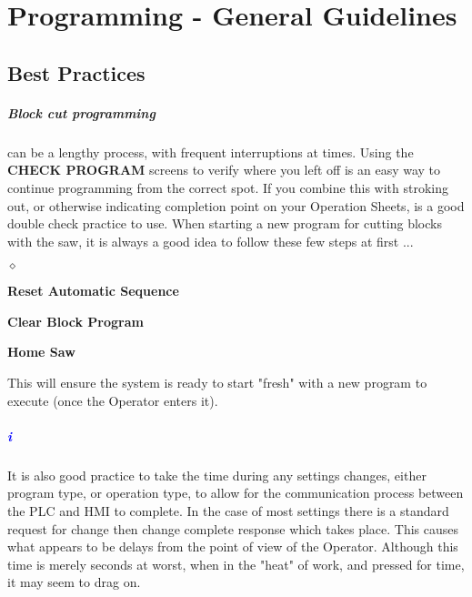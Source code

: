 \chapter{Programming - General Guidelines}
\section{Best Practices}\paragraph*{Block cut programming}can be a lengthy process, with frequent interruptions at times. Using the \textbf{CHECK PROGRAM} screens to verify where you left off is an easy way to continue programming from the correct spot. If you combine this with stroking out, or otherwise indicating completion point on your Operation Sheets, is a good double check practice to use. When starting a new program for cutting blocks with the saw, it is always a good idea to follow these few steps at first ...
\begin{list}{$\diamond$}{}
	\item \textbf{Reset Automatic Sequence}
	\item \textbf{Clear Block Program}
	\item \textbf{Home Saw}
\end{list}
This will ensure the system is ready to start "fresh" with a new program to execute (once the Operator enters it). 
\paragraph{\textbf{\LARGE \textcolor{blue}{i}}}It is also good practice to take the time during any settings changes, either program type, or operation type, to allow for the communication process between the PLC and HMI to complete. In the case of most settings there is a standard request for change then change complete response which takes place. This causes what appears to be delays from the point of view of the Operator. Although this time is merely seconds at worst, when in the "heat" of work, and pressed for time, it may seem to drag on.
